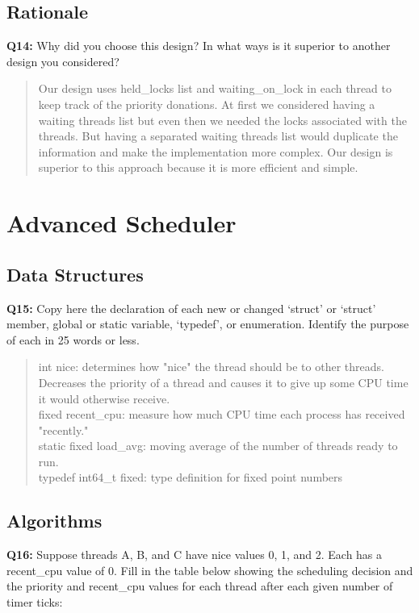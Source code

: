 \documentclass[a4paper,11pt]{paper}
\begin{document}
\subsection{Rationale}

\textbf{Q14:} Why did you choose this design?  In what ways is it superior to another design you considered?
\begin{quote}
  Our design uses held\_locks list and waiting\_on\_lock in each thread to keep track of the priority donations.
 At first we considered having a waiting threads list but even then we needed the locks associated with the threads.
 But having a separated waiting threads list would duplicate the information and make the implementation more complex.
 Our design is superior to this approach because it is more efficient and simple.
\end{quote}

\section{Advanced Scheduler}

\subsection{Data Structures}

\textbf{Q15:} Copy here the declaration of each new or changed `struct' or `struct' member, global or static variable, `typedef', or enumeration.  Identify the purpose of each in 25 words or less.
\begin{quote}
int nice: determines how "nice" the thread should be to other threads. Decreases the priority of a thread and causes it to give up some CPU time it would otherwise receive.\\
fixed recent\_cpu: measure how much CPU time each process has received "recently."\\
static fixed load\_avg: moving average of the number of threads ready to run.\\
typedef int64\_t fixed: type definition for fixed point numbers\\
\end{quote}

\subsection{Algorithms}

\textbf{Q16:} Suppose threads A, B, and C have nice values 0, 1, and 2.  Each has a recent\_cpu value of 0.  Fill in the table below showing the scheduling decision and the priority and recent\_cpu values for each thread after each given number of timer ticks:
\end{document}
